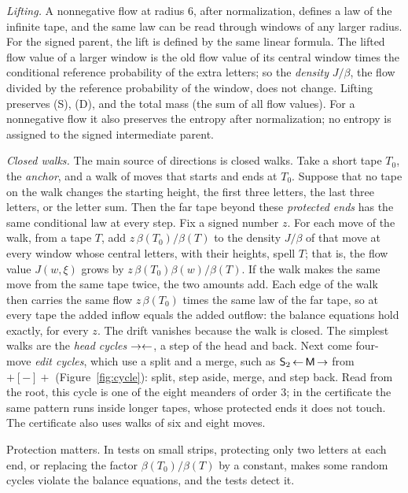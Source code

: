\emph{Lifting.} A nonnegative flow at radius $6$, after normalization, defines a law of the infinite tape, and the same law can
be read through windows of any larger radius. For the signed parent, the lift is defined by the same linear formula. The lifted flow value of a larger window is the old flow value of its central window times the
conditional reference probability of the extra letters; so the \emph{density} $J/\beta$, the flow divided by the
reference probability of the window, does not change. Lifting preserves (S), (D), and the total mass (the sum of all flow values). For a nonnegative flow it also
preserves the entropy after normalization; no entropy is assigned to the signed intermediate parent.

\emph{Closed walks.} The main source of directions is closed walks. Take a short tape $T_0$, the \emph{anchor}, and a
walk of moves that starts and ends at $T_0$. Suppose that no tape on the walk changes the starting height, the first
three letters, the last three letters, or the letter sum. Then the far tape beyond these \emph{protected ends} has the
same conditional law at every step. Fix a signed number $z$. For each move of the walk, from a tape $T$, add
$z\,\beta(T_0)/\beta(T)$ to the density $J/\beta$ of that move at every window whose central letters, with their
heights, spell $T$; that is, the flow value $J(w,\xi)$ grows by $z\,\beta(T_0)\beta(w)/\beta(T)$. If the walk makes the
same move from the same tape twice, the two amounts add. Each edge of the walk then carries the same
flow $z\,\beta(T_0)$ times the same law of the far tape, so at every tape the added inflow equals the added outflow:
the balance equations hold exactly, for every $z$. The drift vanishes because the walk is closed. The simplest walks
are the \emph{head cycles} $\mathord{\rightarrow}\mathord{\leftarrow}$, a step of the head and back. Next come four-move \emph{edit cycles}, which use a
split and a merge, such as $\mathsf{S}_2\,\mathord{\leftarrow}\,\mathsf{M}\,\mathord{\rightarrow}$ from $+[-]+$ (Figure~\ref{fig:cycle}): split, step aside, merge, and
step back. Read from the root, this cycle is one of the eight meanders of order $3$; in the certificate the same
pattern runs inside longer tapes, whose protected ends it does not touch. The certificate also uses walks of six and
eight moves.

Protection matters. In tests on small strips, protecting only two letters at each end, or replacing the factor
$\beta(T_0)/\beta(T)$ by a constant, makes some random cycles violate the balance equations, and the tests detect it.

